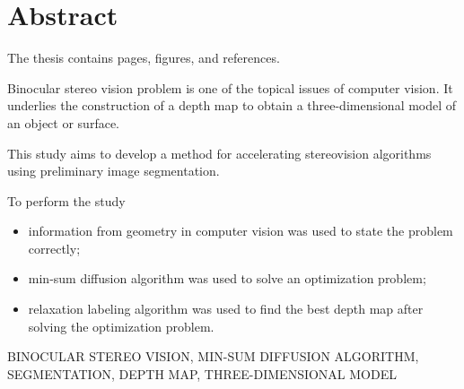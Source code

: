 \chapter*{Abstract}

The thesis contains \pageref{LastPage} pages,
 figures, and
 references.

Binocular stereo vision problem is one of the topical issues
of computer vision.
It underlies the construction of a depth map to obtain a three-dimensional model
of an object or surface.

This study aims to develop a method
for accelerating stereovision algorithms using preliminary image segmentation.

To perform the study
\begin{itemize}
  \item information from geometry
        in computer vision was used to state the problem correctly;
  \item min-sum diffusion algorithm was used to solve an optimization problem;
  \item relaxation labeling algorithm was used to find the best depth map after
        solving the optimization problem.
\end{itemize}

\MakeUppercase{binocular stereo vision,
               min-sum diffusion algorithm,
               segmentation,
               depth map,
               three-dimensional model}
